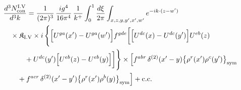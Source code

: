 \begingroup\small
\begin{align}\label{eq:H-I.V-2}
&\frac{d^{3}N^{\rm I.V}_{{\rm con}}}{d^{3}k}=\frac{1}{(2\pi)^{3}}\, \frac{ig^{4}}{16\pi^{4}}\, \frac{1}{k^{+}} \int_{0}^{1}\frac{d\xi}{2\pi} \int_{x,z,y,y',x',w'}e^{-ik\cdot(z-w')}\notag\\
&\quad \times \mathfrak{K}_{\rm I.V} \times i\, \Bigg\{\Big[U^{ga}(x')-U^{ga}(w')\Big]f^{gde}\bigg[\Big[U^{dc}(x)-U^{dc}(y')\Big]U^{eb}(z)\notag\\
&\quad\quad\quad +U^{dc}(y')\Big[U^{eb}(z)-U^{eb}(y)\Big]\bigg]\Bigg\} \times\Big[f^{abr}\, \delta^{(2)}(x'-y)\big\{\rho^{r}(x')\rho^{c}(y')\big\}_{\rm sym}\notag\\
&\quad\quad +f^{acr}\, \delta^{(2)}(x'-y')\big\{\rho^{r}(x')\rho^{b}(y)\big\}_{\rm sym}\Big] +{\rm c.c.}
\end{align}
\endgroup
